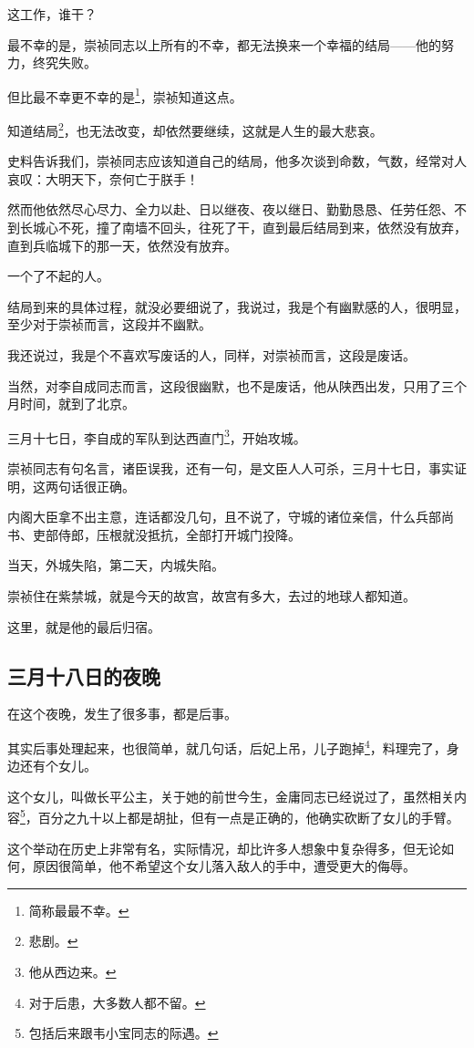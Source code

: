 \begin{multicols}{\theparacolNo}
这工作，谁干？

最不幸的是，崇祯同志以上所有的不幸，都无法换来一个幸福的结局——他的努力，终究失败。

但比最不幸更不幸的是\footnote{简称最最不幸。}，崇祯知道这点。

知道结局\footnote{悲剧。}，也无法改变，却依然要继续，这就是人生的最大悲哀。

史料告诉我们，崇祯同志应该知道自己的结局，他多次谈到命数，气数，经常对人哀叹：大明天下，奈何亡于朕手！

然而他依然尽心尽力、全力以赴、日以继夜、夜以继日、勤勤恳恳、任劳任怨、不到长城心不死，撞了南墙不回头，往死了干，直到最后结局到来，依然没有放弃，直到兵临城下的那一天，依然没有放弃。

一个了不起的人。

结局到来的具体过程，就没必要细说了，我说过，我是个有幽默感的人，很明显，至少对于崇祯而言，这段并不幽默。

我还说过，我是个不喜欢写废话的人，同样，对崇祯而言，这段是废话。

当然，对李自成同志而言，这段很幽默，也不是废话，他从陕西出发，只用了三个月时间，就到了北京。

三月十七日，李自成的军队到达西直门\footnote{他从西边来。}，开始攻城。

崇祯同志有句名言，诸臣误我，还有一句，是文臣人人可杀，三月十七日，事实证明，这两句话很正确。

内阁大臣拿不出主意，连话都没几句，且不说了，守城的诸位亲信，什么兵部尚书、吏部侍郎，压根就没抵抗，全部打开城门投降。

当天，外城失陷，第二天，内城失陷。

崇祯住在紫禁城，就是今天的故宫，故宫有多大，去过的地球人都知道。

这里，就是他的最后归宿。

\subsection{三月十八日的夜晚}
在这个夜晚，发生了很多事，都是后事。

其实后事处理起来，也很简单，就几句话，后妃上吊，儿子跑掉\footnote{对于后患，大多数人都不留。}，料理完了，身边还有个女儿。

这个女儿，叫做长平公主，关于她的前世今生，金庸同志已经说过了，虽然相关内容\footnote{包括后来跟韦小宝同志的际遇。}，百分之九十以上都是胡扯，但有一点是正确的，他确实砍断了女儿的手臂。

这个举动在历史上非常有名，实际情况，却比许多人想象中复杂得多，但无论如何，原因很简单，他不希望这个女儿落入敌人的手中，遭受更大的侮辱。


\end{multicols}
